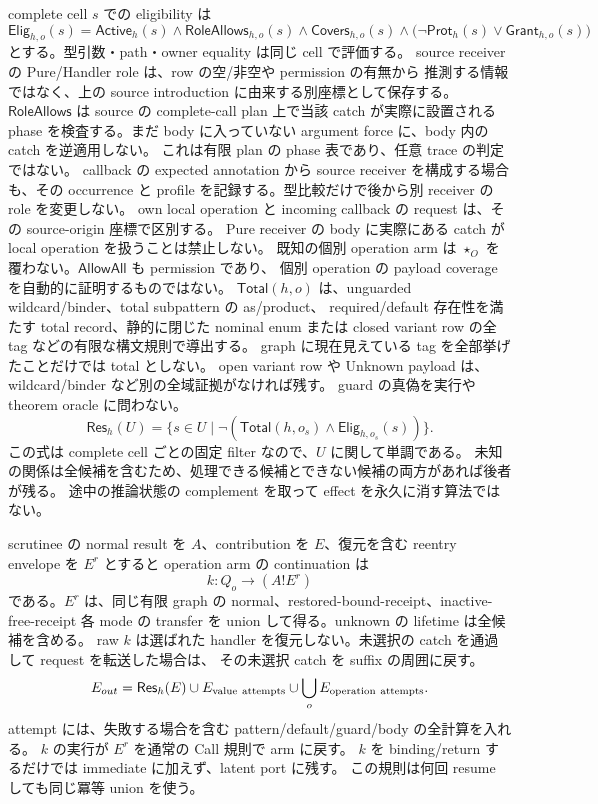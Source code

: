 \documentclass[11pt,a4paper]{article}
\theoremstyle{remark}
\begin{document}
complete cell $s$ での eligibility は
\[
 \mathsf{Elig}_{h,o}(s)=
 \mathsf{Active}_h(s)\land\mathsf{RoleAllows}_{h,o}(s)
 \land\mathsf{Covers}_{h,o}(s)
 \land\bigl(\neg\mathsf{Prot}_{h}(s)\lor\mathsf{Grant}_{h,o}(s)\bigr)
\]
とする。型引数・path・owner equality は同じ cell で評価する。
source receiver の Pure/Handler role は、row の空/非空や permission の有無から
推測する情報ではなく、上の source introduction に由来する別座標として保存する。
$\mathsf{RoleAllows}$ は source の complete-call plan 上で当該 catch が実際に設置される phase
を検査する。まだ body に入っていない argument force に、body 内の catch を逆適用しない。
これは有限 plan の phase 表であり、任意 trace の判定ではない。
callback の expected annotation から source receiver を構成する場合も、その occurrence と
profile を記録する。型比較だけで後から別 receiver の role を変更しない。
own local operation と incoming callback の request は、その source-origin 座標で区別する。
Pure receiver の body に実際にある catch が local operation を扱うことは禁止しない。
既知の個別 operation arm は $\star_O$ を覆わない。$\mathsf{AllowAll}$ も permission であり、
個別 operation の payload coverage を自動的に証明するものではない。
$\mathsf{Total}(h,o)$ は、unguarded wildcard/binder、total subpattern の as/product、
required/default 存在性を満たす total record、静的に閉じた nominal enum または
closed variant row の全 tag などの有限な構文規則で導出する。
graph に現在見えている tag を全部挙げたことだけでは total としない。
open variant row や Unknown payload は、wildcard/binder など別の全域証拠がなければ残す。
guard の真偽を実行や theorem oracle に問わない。
\[
 \mathsf{Res}_{h}(U)=
 \{s\in U\mid \neg(\mathsf{Total}(h,o_s)\land\mathsf{Elig}_{h,o_s}(s))\}.
\]
この式は complete cell ごとの固定 filter なので、$U$ に関して単調である。
未知の関係は全候補を含むため、処理できる候補とできない候補の両方があれば後者が残る。
途中の推論状態の complement を取って effect を永久に消す算法ではない。

scrutinee の normal result を $A$、contribution を $E$、復元を含む reentry envelope を $E^r$ とすると
operation arm の continuation は
\[
 k:Q_o\longrightarrow(A\mathbin{!}E^r)
\]
である。$E^r$ は、同じ有限 graph の normal、restored-bound-receipt、inactive-free-receipt
各 mode の transfer を union して得る。unknown の lifetime は全候補を含める。
raw $k$ は選ばれた handler を復元しない。未選択の catch を通過して request を転送した場合は、
その未選択 catch を suffix の周囲に戻す。
\[
 E_{out}=\mathsf{Res}_{h}(E)\cup E_{\rm value\ attempts}
                       \cup\bigcup_oE_{\rm operation\ attempts}.
\]
attempt には、失敗する場合を含む pattern/default/guard/body の全計算を入れる。
$k$ の実行が $E^r$ を通常の Call 規則で arm に戻す。
$k$ を binding/return するだけでは immediate に加えず、latent port に残す。
この規則は何回 resume しても同じ冪等 union を使う。
\end{document}
